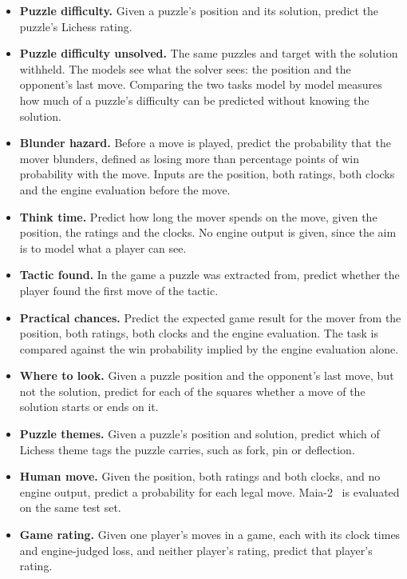 \documentclass[11pt]{article}
\begin{document}
\begin{itemize}
\item \textbf{Puzzle difficulty.} Given a puzzle's position and its solution,
predict the puzzle's Lichess rating.
\item \textbf{Puzzle difficulty unsolved.} The same puzzles and target with
the solution withheld. The models see what the solver sees: the position and
the opponent's last move. Comparing the two tasks model by model measures how
much of a puzzle's difficulty can be predicted without knowing the solution.
\item \textbf{Blunder hazard.} Before a move is played, predict the
probability that the mover blunders, defined as losing more than
 percentage points of win probability with the move.
Inputs are the position, both ratings, both clocks and the engine evaluation
before the move.
\item \textbf{Think time.} Predict how long the mover spends on the move,
given the position, the ratings and the clocks. No engine output is
given, since the aim is to model what a player can see.
\item \textbf{Tactic found.} In the game a puzzle was extracted from, predict
whether the player found the first move of the tactic.
\item \textbf{Practical chances.} Predict the expected game result for the
mover from the position, both ratings, both clocks and the engine
evaluation. The task is compared against the win probability implied by the
engine evaluation alone.
\item \textbf{Where to look.} Given a puzzle position and the opponent's last
move, but not the solution, predict for each of the
 squares whether a move of the
solution starts or ends on it.
\item \textbf{Puzzle themes.} Given a puzzle's position and solution, predict
which of  Lichess theme tags the
puzzle carries, such as fork, pin or deflection.
\item \textbf{Human move.} Given the position, both ratings and both clocks,
and no engine output, predict a probability for each legal move.
Maia-2~\cite{maia2} is evaluated on the same test set.
\item \textbf{Game rating.} Given one player's moves in a game, each with its
clock times and engine-judged loss, and neither player's rating, predict
that player's rating.
\end{itemize}
\end{document}
